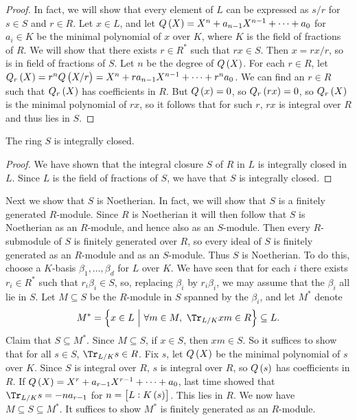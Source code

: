\begin{proof}
In fact, we will show that every element of $ L $ can be expressed as $ s / r $ for $ s \in S $ and $ r \in R $. Let $ x \in L $, and let $ Q\br{X} = X^n + a_{n - 1}X^{n - 1} + \dots + a_0 $ for $ a_i \in K $ be the minimal polynomial of $ x $ over $ K $, where $ K $ is the field of fractions of $ R $. We will show that there exists $ r \in R^* $ such that $ rx \in S $. Then $ x = rx / r $, so is in field of fractions of $ S $. Let $ n $ be the degree of $ Q\br{X} $. For each $ r \in R $, let $ Q_r\br{X} = r^nQ\br{X / r} = X^n + ra_{n - 1}X^{n - 1} + \dots + r^na_0 $. We can find an $ r \in R $ such that $ Q_r\br{X} $ has coefficients in $ R $. But $ Q\br{x} = 0 $, so $ Q_r\br{rx} = 0 $, so $ Q_r\br{X} $ is the minimal polynomial of $ rx $, so it follows that for such $ r $, $ rx $ is integral over $ R $ and thus lies in $ S $.
\end{proof}

\begin{corollary}
The ring $ S $ is integrally closed.
\end{corollary}

\begin{proof}
We have shown that the integral closure $ S $ of $ R $ in $ L $ is integrally closed in $ L $. Since $ L $ is the field of fractions of $ S $, we have that $ S $ is integrally closed.
\end{proof}


Next we show that $ S $ is Noetherian. In fact, we will show that $ S $ is a finitely generated $ R $-module. Since $ R $ is Noetherian it will then follow that $ S $ is Noetherian as an $ R $-module, and hence also as an $ S $-module. Then every $ R $-submodule of $ S $ is finitely generated over $ R $, so every ideal of $ S $ is finitely generated as an $ R $-module and as an $ S $-module. Thus $ S $ is Noetherian. To do this, choose a $ K $-basis $ \beta_1, \dots, \beta_d $ for $ L $ over $ K $. We have seen that for each $ i $ there exists $ r_i \in R^* $ such that $ r_i\beta_i \in S $, so, replacing $ \beta_i $ by $ r_i\beta_i $, we may assume that the $ \beta_i $ all lie in $ S $. Let $ M \subseteq S $ be the $ R $-module in $ S $ spanned by the $ \beta_i $, and let $ M^* $ denote
$$ M^* = \cbr{x \in L \st \forall m \in M, \ \Tr_{L / K} xm \in R} \subseteq L. $$
Claim that $ S \subseteq M^* $. Since $ M \subseteq S $, if $ x \in S $, then $ xm \in S $. So it suffices to show that for all $ s \in S $, $ \Tr_{L / K} s \in R $. Fix $ s $, let $ Q\br{X} $ be the minimal polynomial of $ s $ over $ K $. Since $ S $ is integral over $ R $, $ s $ is integral over $ R $, so $ Q\br{s} $ has coefficients in $ R $. If $ Q\br{X} = X^r + a_{r - 1}X^{r - 1} + \dots + a_0 $, last time showed that $ \Tr_{L / K} s = -na_{r - 1} $ for $ n = \sbr{L : K\br{s}} $. This lies in $ R $. We now have $ M \subseteq S \subseteq M^* $. It suffices to show $ M^* $ is finitely generated as an $ R $-module.

